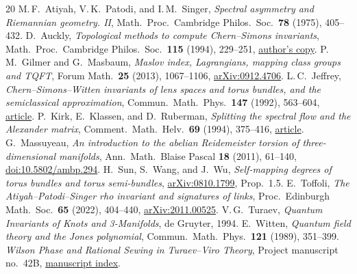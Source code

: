 \documentclass[11pt]{article}
\theoremstyle{remark}\newtheorem{remark}[theorem]{Remark}
\begin{document}
\begin{thebibliography}{20}
 M.\,F.~Atiyah, V.\,K.~Patodi, and I.\,M.~Singer,
\emph{Spectral asymmetry and Riemannian geometry. II},
Math.\ Proc.\ Cambridge Philos.\ Soc.\ \textbf{78} (1975), 405--432.
 D.~Auckly, \emph{Topological methods to compute Chern--Simons invariants},
Math.\ Proc.\ Cambridge Philos.\ Soc.\ \textbf{115} (1994), 229--251,
\href{https://www.math.ksu.edu/about/personal/dav/topmethCS.pdf}{author's copy}.
 P.\,M.~Gilmer and G.~Masbaum,
\emph{Maslov index, Lagrangians, mapping class groups and TQFT},
Forum Math.\ \textbf{25} (2013), 1067--1106,
\href{https://arxiv.org/abs/0912.4706}{arXiv:0912.4706}.
 L.\,C.~Jeffrey, \emph{Chern--Simons--Witten invariants of lens spaces and torus bundles, and the semiclassical approximation},
Commun.\ Math.\ Phys.\ \textbf{147} (1992), 563--604,
\href{https://webhomes.maths.ed.ac.uk/~v1ranick/papers/jeffrey.pdf}{article}.
 P.~Kirk, E.~Klassen, and D.~Ruberman,
\emph{Splitting the spectral flow and the Alexander matrix},
Comment.\ Math.\ Helv.\ \textbf{69} (1994), 375--416,
\href{https://webhomes.maths.ed.ac.uk/~v1ranick/papers/kirklarub.pdf}{article}.
 G.~Massuyeau,
\emph{An introduction to the abelian Reidemeister torsion of three-dimensional manifolds},
Ann.\ Math.\ Blaise Pascal \textbf{18} (2011), 61--140,
\href{https://doi.org/10.5802/ambp.294}{doi:10.5802/ambp.294}.
 H.~Sun, S.~Wang, and J.~Wu,
\emph{Self-mapping degrees of torus bundles and torus semi-bundles},
\href{https://arxiv.org/abs/0810.1799}{arXiv:0810.1799}, Prop.\ 1.5.
 E.~Toffoli,
\emph{The Atiyah--Patodi--Singer rho invariant and signatures of links},
Proc.\ Edinburgh Math.\ Soc.\ \textbf{65} (2022), 404--440,
\href{https://arxiv.org/abs/2011.00525}{arXiv:2011.00525}.
 V.\,G.~Turaev,
\emph{Quantum Invariants of Knots and 3-Manifolds}, de Gruyter, 1994.
 E.~Witten, \emph{Quantum field theory and the Jones polynomial},
Commun.\ Math.\ Phys.\ \textbf{121} (1989), 351--399.
 \emph{Wilson Phase and Rational Sewing in Turaev--Viro Theory},
Project manuscript no.~42B, \href{https://github.com/g3173028019-beep/ai-automated-quantum-gravity-research/blob/main/docs/PAPER-INDEX.md}{manuscript index}.
\end{thebibliography}
\end{document}
